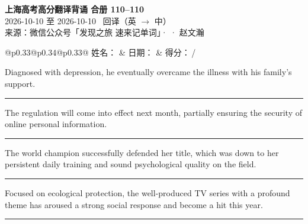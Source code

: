 \documentclass[11pt,a4paper]{article}
\newcommand{\num}[1]{\makebox[1.9em][r]{#1.}\hspace{0.3em}}
\newcommand{\wline}{\noindent\rule{\linewidth}{0.4pt}}
\begin{document}
\pagestyle{plain}
\begin{center}
{\LARGE\bfseries 上海高考高分翻译背诵 \quad 合册 110–110}\\[0.25em]
{\large 2026-10-10 至 2026-10-10 \quad\ 回译（英 $\to$ 中）}\\[0.35em]
{\footnotesize 来源：微信公众号「发现之旅 速来记单词」·  · 赵文瀚}
\end{center}

\vspace{0.4em}
\noindent\begin{tabular}{@{}p{0.33\textwidth}@{}p{0.34\textwidth}@{}p{0.33\textwidth}@{}}
姓名：\underline{\hspace{2.0cm}} & 日期：\underline{\hspace{2.0cm}} & 得分：\underline{\hspace{1.4cm}}\,/ \\
\end{tabular}

\vspace{0.5em}

\vspace{0.8em}
\vspace{0.35em}\vspace{0.15em}

\begin{minipage}{\linewidth}

\num{1}Diagnosed with depression, he eventually overcame the illness with his family’s support.

\vspace{0.25em}

\wline

\end{minipage}

\begin{minipage}{\linewidth}

\num{2}The regulation will come into effect next month, partially ensuring the security of online personal information.

\vspace{0.25em}

\wline

\end{minipage}

\begin{minipage}{\linewidth}

\num{3}The world champion successfully defended her title, which was down to her persistent daily training and sound psychological quality on the field.

\vspace{0.25em}

\wline

\end{minipage}

\begin{minipage}{\linewidth}

\num{4}Focused on ecological protection, the well-produced TV series with a profound theme has aroused a strong social response and become a hit this year.

\vspace{0.25em}

\wline

\end{minipage}
\end{document}
